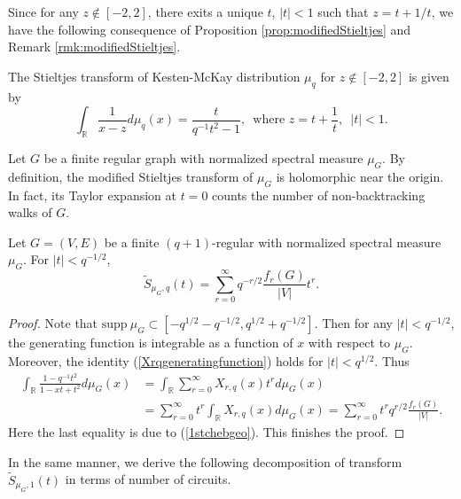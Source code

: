 \documentclass{article}
\begin{document}
Since for any $z\notin [-2,2]$, there exits a unique $t$, $|t|<1$ such that $z=t+1/t$, we have the following consequence of Proposition \ref{prop:modifiedStieltjes} and Remark \ref{rmk:modifiedStieltjes}.

\begin{corollary}
The Stieltjes transform of Kesten-McKay distribution $\mu_q$ for $z\notin [-2,2]$ is given by
    \begin{equation*}
    \int_{\mathbb{R}}\frac{1}{x-z}d\mu_q(x)=\frac{t}{q^{-1}t^2-1},\,\,\,\text{where}\,\,z=t+\frac{1}{t},\,\,\,|t|<1.
\end{equation*}
\end{corollary}


Let $G$ be a finite regular graph with normalized spectral measure $\mu_G$. By definition, the modified Stieltjes transform of $\mu_G$ is holomorphic near the origin. In fact, its Taylor expansion at $t=0$ counts the number of non-backtracking walks of $G$.

\begin{proposition}\label{stieltjesq}
    Let $G=(V,E)$ be a finite $(q+1)$-regular with normalized spectral measure $\mu_G$. For $|t|<q^{-1/2}$, 
    \begin{equation*}
        \widetilde{S}_{\mu_G,q}(t)=\sum_{r=0}^{\infty}q^{-r/2}\frac{f_r(G)}{|V|}t^r.
    \end{equation*}
\end{proposition}
\begin{proof}
    Note that $\mathrm{supp}\ \mu_G \subset [-q^{1/2}-q^{-1/2}, q^{1/2}+q^{-1/2}]$. Then for any $|t|< q^{-1/2}$, the generating function is integrable as a function of $x$ with respect to $\mu_G $.  Moreover, the identity (\ref{Xrqgeneratingfunction}) holds for $|t|< q^{1/2}$. Thus \begin{equation*}
\begin{aligned}
    \int_{\mathbb{R}}\frac{1-q^{-1}t^2}{1-xt+t^2}d\mu_G(x)&=\int_{\mathbb{R}}\sum_{r=0}^{\infty}X_{r,q}(x)t^{r}d\mu_G(x)\\
    &=\sum_{r=0}^{\infty}t^{r}\int_{\mathbb{R}}X_{r,q}(x)d\mu_G(x)=\sum_{r=0}^{\infty}t^{r}q^{r/2}\frac{f_r(G)}{|V|}.
\end{aligned}
\end{equation*}
Here the last equality is due to (\ref{1stchebgeo}). This finishes the proof.
\end{proof}

In the same manner, we derive the following decomposition of transform $\widetilde{S}_{\mu_G,1}(t)$ in terms of number of circuits.
\end{document}
